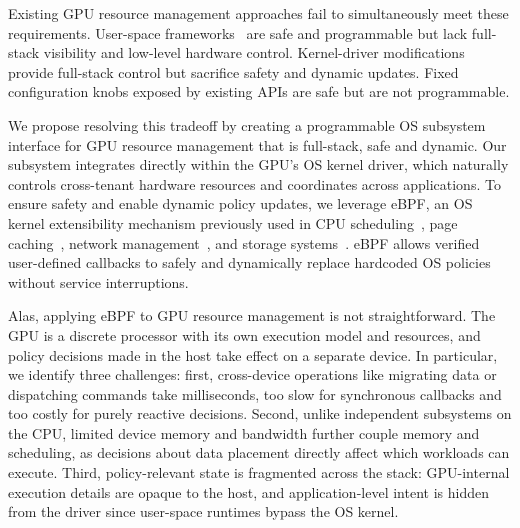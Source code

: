 Existing GPU resource management approaches fail to simultaneously meet these requirements. User-space frameworks~\cite{ng2023paella,shen2025xsched,gim2025pie,chen2025ktransformers} are safe and programmable but lack full-stack visibility and low-level hardware control. Kernel-driver modifications~\cite{kato2011timegraph,kato2012gdev,kernelintercept,fan2025gpreempt,wang2024gcaps} provide full-stack control but sacrifice safety and dynamic updates. Fixed configuration knobs exposed by existing APIs are safe but are not programmable.

We propose resolving this tradeoff by creating a programmable OS subsystem interface for GPU resource management that is full-stack, safe and dynamic. Our subsystem integrates directly within the GPU's OS kernel driver, which naturally controls cross-tenant hardware resources and coordinates across applications. To ensure safety and enable dynamic policy updates, we leverage eBPF, an OS kernel extensibility mechanism previously used in CPU scheduling~\cite{schedext-docs}, page caching~\cite{zussman2025cache_ext}, network management~\cite{bachl2021flow,Zhong22}, and storage systems~\cite{jia2023programmable}. eBPF allows verified user-defined callbacks to safely and dynamically replace hardcoded OS policies without service interruptions.

Alas, applying eBPF to GPU resource management is not straightforward. The GPU is a discrete processor with its own execution model and resources, and policy decisions made in the host take effect on a separate device. In particular, we identify three challenges: first, cross-device operations like migrating data or dispatching commands take milliseconds, too slow for synchronous callbacks and too costly for purely reactive decisions. Second, unlike independent subsystems on the CPU, limited device memory and bandwidth further couple memory and scheduling, as decisions about data placement directly affect which workloads can execute. Third, policy-relevant state is fragmented across the stack: GPU-internal execution details are opaque to the host, and application-level intent is hidden from the driver since user-space runtimes bypass the OS kernel.

